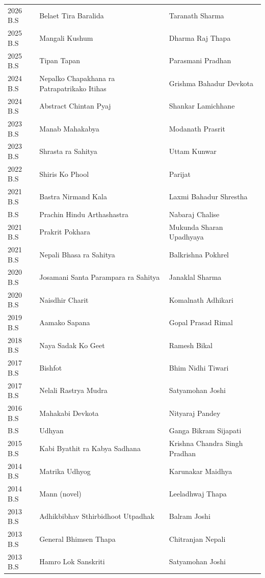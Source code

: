 \documentclass[
  openany]{book}
\begin{document}
\begin{longtable}[t]{l>{\raggedright\arraybackslash}p{14em}>{\raggedright\arraybackslash}p{24em}}
\rowcolor{gray!6}  2026 B.S & Belaet Tira Baralida & Taranath Sharma\\
2025 B.S & Mangali Kushum & Dharma Raj Thapa\\
\rowcolor{gray!6}  2025 B.S & Tipan Tapan & Parasmani Pradhan\\
2024 B.S & Nepalko Chapakhana ra Patrapatrikako Itihas & Grishma Bahadur Devkota\\
\addlinespace
\rowcolor{gray!6}  2024 B.S & Abstract Chintan Pyaj & Shankar Lamichhane\\
2023 B.S & Manab Mahakabya & Modanath Prasrit\\
\rowcolor{gray!6}  2023 B.S & Shrasta ra Sahitya & Uttam Kunwar\\
2022 B.S & Shiris Ko Phool & Parijat\\
\rowcolor{gray!6}  2021 B.S & Bastra Nirmand Kala & Laxmi Bahadur Shrestha\\
\addlinespace
2021 B.S & Prachin Hindu Arthashastra & Nabaraj Chalise\\
\rowcolor{gray!6}  2021 B.S & Prakrit Pokhara & Mukunda Sharan Upadhyaya\\
2021 B.S & Nepali Bhasa ra Sahitya & Balkrishna Pokhrel\\
\rowcolor{gray!6}  2020 B.S & Josamani Santa Parampara ra Sahitya & Janaklal Sharma\\
2020 B.S & Naisdhir Charit & Komalnath Adhikari\\
\addlinespace
\rowcolor{gray!6}  2019 B.S & Aamako Sapana & Gopal Prasad Rimal\\
2018 B.S & Naya Sadak Ko Geet & Ramesh Bikal\\
\rowcolor{gray!6}  2017 B.S & Bishfot & Bhim Nidhi Tiwari\\
2017 B.S & Nelali Rastrya Mudra & Satyamohan Joshi\\
\rowcolor{gray!6}  2016 B.S & Mahakabi Devkota & Nityaraj Pandey\\
\addlinespace
2015 B.S & Udhyan & Ganga Bikram Sijapati\\
\rowcolor{gray!6}  2015 B.S & Kabi Byathit ra Kabya Sadhana & Krishna Chandra Singh Pradhan\\
2014 B.S & Matrika Udhyog & Karunakar Maidhya\\
\rowcolor{gray!6}  2014 B.S & Mann (novel) & Leeladhwaj Thapa\\
2013 B.S & Adhikbibhav Sthirbidhoot Utpadhak & Balram Joshi\\
\addlinespace
\rowcolor{gray!6}  2013 B.S & General Bhimsen Thapa & Chitranjan Nepali\\
2013 B.S & Hamro Lok Sanskriti & Satyamohan Joshi\\
\bottomrule
\end{longtable}
\endgroup{}
\end{document}
